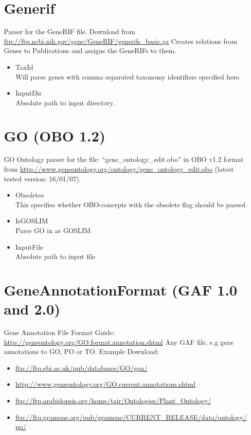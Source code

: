     
\section{Generif}
Parser for the GeneRIF file.   
Download from \url{ftp://ftp.ncbi.nih.gov/gene/GeneRIF/generifs_basic.gz}
Creates relations from Genes to Publications and assigns the GeneRIFs to them.

\begin{itemize}
  \item{TaxId}\\
  Will parse genes with comma separated taxonomy identifiers specified here.
  \item{InputDir}\\
  Absolute path to input directory.
\end{itemize}
    
    
\section{GO (OBO 1.2)}
GO Ontology parser for the file: ``gene\_ontology\_edit.obo'' in OBO v1.2 format 
from \url{http://www.geneontology.org/ontology/gene_ontology_edit.obo} (latest tested version: 16/01/07).
\begin{itemize}
  \item{Obsoletes}\\
  This specifies whether OBO-concepts with the obsolete flag should be parsed.
  \item{IsGOSLIM}\\
  Parse GO in as GOSLIM
  \item{InputFile}\\
  Absolute path to input file
\end{itemize}
    
\section{GeneAnnotationFormat (GAF 1.0 and 2.0)}
Gene Annotation File Format Guide: \url{http://geneontology.org/GO.format.annotation.shtml}
Any GAF file, e.g gene annotations to GO, PO or TO. Example Download: 
\begin{itemize}
\item\url{ftp://ftp.ebi.ac.uk/pub/databases/GO/goa/}
\item\url{http://www.geneontology.org/GO.current.annotations.shtml}
\item\url{ftp://ftp.arabidopsis.org/home/tair/Ontologies/Plant_Ontology/}
\item\url{ftp://ftp.gramene.org/pub/gramene/CURRENT_RELEASE/data/ontology/po/}
\end{itemize}

